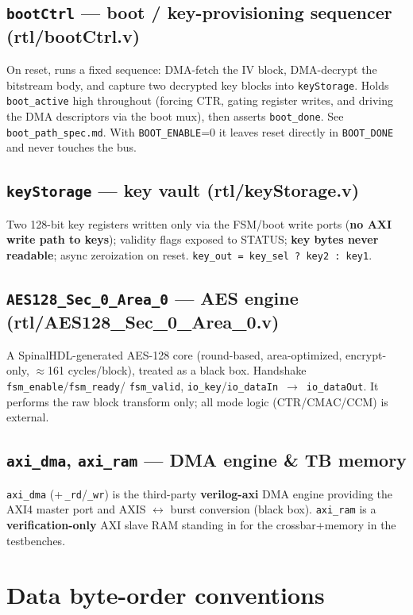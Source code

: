 \documentclass[11pt,a4paper]{article}
\newcommand{\reg}[1]{\texttt{#1}}
\begin{document}
\subsection{\texttt{bootCtrl} --- boot / key-provisioning sequencer (rtl/bootCtrl.v)}
On reset, runs a fixed sequence: DMA-fetch the IV block, DMA-decrypt the bitstream body, and
capture two decrypted key blocks into \reg{keyStorage}. Holds \texttt{boot\_active} high
throughout (forcing CTR, gating register writes, and driving the DMA descriptors via the boot
mux), then asserts \texttt{boot\_done}. See \texttt{boot\_path\_spec.md}. With
\texttt{BOOT\_ENABLE}=0 it leaves reset directly in \texttt{BOOT\_DONE} and never touches the bus.

\subsection{\texttt{keyStorage} --- key vault (rtl/keyStorage.v)}
Two 128-bit key registers written only via the FSM/boot write ports (\textbf{no AXI write path
to keys}); validity flags exposed to STATUS; \textbf{key bytes never readable}; async
zeroization on reset. \texttt{key\_out = key\_sel ? key2 : key1}.

\subsection{\texttt{AES128\_Sec\_0\_Area\_0} --- AES engine (rtl/AES128\_Sec\_0\_Area\_0.v)}
A SpinalHDL-generated AES-128 core (round-based, area-optimized, encrypt-only, $\approx$161
cycles/block), treated as a black box. Handshake \texttt{fsm\_enable}/\texttt{fsm\_ready}/%
\texttt{fsm\_valid}, \texttt{io\_key}/\texttt{io\_dataIn}~$\rightarrow$~\texttt{io\_dataOut}.
It performs the raw block transform only; all mode logic (CTR/CMAC/CCM) is external.

\subsection{\texttt{axi\_dma}, \texttt{axi\_ram} --- DMA engine \& TB memory}
\reg{axi\_dma} (+\,\texttt{\_rd}/\texttt{\_wr}) is the third-party \textbf{verilog-axi} DMA
engine providing the AXI4 master port and AXIS $\leftrightarrow$ burst conversion (black box).
\reg{axi\_ram} is a \textbf{verification-only} AXI slave RAM standing in for the crossbar+memory
in the testbenches.

\section{Data byte-order conventions}\label{sec:byteorder}
\end{document}
